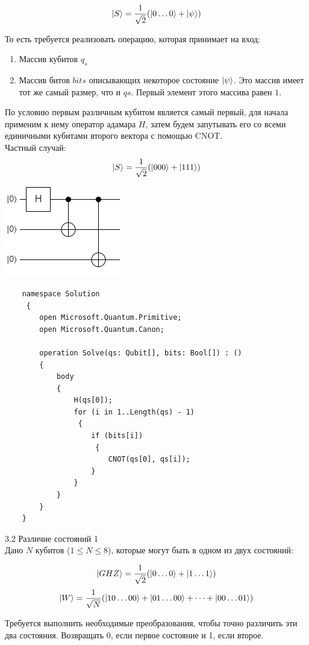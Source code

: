 \documentclass[12pt]{article}
\begin{document}
	$$\Ket{S} = \frac{1}{\sqrt2}(\Ket{0\dots0} +\Ket{\psi})$$

	То есть требуется реализовать операцию, которая принимает на вход:

	\begin{enumerate}
    		\item Массив кубитов $q_s$
   		 \item Массив битов $bits$ описывающих некоторое состояние $\Ket{\psi}$. Это массив имеет тот же самый размер, что и $qs$. Первый элемент этого массива равен $1$.
	\end{enumerate}
	\indent По условию первым различным кубитом является самый первый, для начала применим к нему оператор адамара $H$, затем будем запутывать его со всеми единичными кубитами второго вектора с помощью CNOT.\\
	Частный случай:
		$$\Ket{S} = \frac{1}{\sqrt{2}}(\Ket{000} + \Ket{111})$$
	\begin{center}
		\includegraphics[scale=1]{curcuit.png}
	\end{center}
	\begin{lstlisting}
	namespace Solution
	 {
	    open Microsoft.Quantum.Primitive;
	    open Microsoft.Quantum.Canon;
	    
	    operation Solve(qs: Qubit[], bits: Bool[]) : () 
	    {
	        body 
	        { 
	            H(qs[0]);
	            for (i in 1..Length(qs) - 1)
	             {
	                if (bits[i])
	                 {
	                    CNOT(qs[0], qs[i]); 
	                } 
	            }                  
	        }
	    }
	}
\end{lstlisting}
	
	3.2 Различие состояний 1\\
	Дано $N$ кубитов ($1 \le N \le 8$), которые могут быть в одном из двух состояний:

	$$\Ket{GHZ} = \frac{1}{\sqrt2}(\Ket{0\dots0} +\Ket{1\dots1})$$
	$$\Ket{W} = \frac{1}{\sqrt N}(\Ket{10\dots00}+\Ket{01\dots00} + \dots +\Ket{00\dots01})$$

	Требуется выполнить необходимые преобразования, чтобы точно различить эти два состояния. Возвращать $0$, если первое состояние и 1, если второе.\\
	
\end{document}
